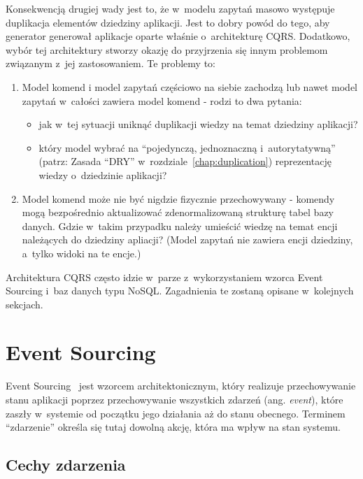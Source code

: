 Konsekwencją drugiej wady jest to, że w~modelu zapytań masowo występuje duplikacja elementów dziedziny aplikacji.
Jest to dobry powód do tego, aby generator generował aplikacje oparte właśnie o~architekturę CQRS.
Dodatkowo, wybór tej architektury stworzy okazję do przyjrzenia się innym problemom związanym z~jej zastosowaniem.
Te problemy to:

\begin{enumerate}
 \item Model komend i model zapytań częściowo na siebie zachodzą lub nawet model zapytań w~całości zawiera model komend - rodzi to dwa pytania:
 \begin{itemize}
  \item jak w~tej sytuacji uniknąć duplikacji wiedzy na temat dziedziny aplikacji?
  \item który model wybrać na “pojedynczą, jednoznaczną i~autorytatywną” (patrz: Zasada ``DRY'' w~rozdziale~\ref{chap:duplication}) reprezentację wiedzy o~dziedzinie aplikacji?
 \end{itemize}
 \item Model komend może nie być nigdzie fizycznie przechowywany - komendy mogą bezpośrednio aktualizować zdenormalizowaną strukturę tabel bazy danych.
 Gdzie w~takim przypadku należy umieścić wiedzę na temat encji należących do dziedziny apliacji?
 (Model zapytań nie zawiera encji dziedziny, a~tylko widoki na te encje.)
\end{enumerate}

Architektura CQRS często idzie w~parze z~wykorzystaniem wzorca Event Sourcing i~baz danych typu NoSQL.
Zagadnienia te zostaną opisane w~kolejnych sekcjach.



\section{Event Sourcing}  \label{sec:event_sourcing}

Event Sourcing~\cite{eventSourcing_msdn} jest wzorcem architektonicznym, który realizuje przechowywanie stanu aplikacji poprzez przechowywanie wszystkich zdarzeń (ang. \emph{event}), które zaszły w~systemie od początku jego działania aż do stanu obecnego.
Terminem ``zdarzenie'' określa się tutaj dowolną akcję, która ma wpływ na stan systemu.


\subsection{Cechy zdarzenia}

